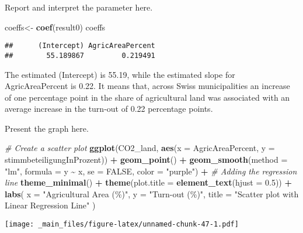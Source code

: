 \documentclass[
]{book}
\newenvironment{Shaded}{\begin{snugshade}}{\end{snugshade}}
\newcommand{\AttributeTok}[1]{\textcolor[rgb]{0.13,0.29,0.53}{#1}}
\newcommand{\CommentTok}[1]{\textcolor[rgb]{0.56,0.35,0.01}{\textit{#1}}}
\newcommand{\ConstantTok}[1]{\textcolor[rgb]{0.56,0.35,0.01}{#1}}
\newcommand{\FloatTok}[1]{\textcolor[rgb]{0.00,0.00,0.81}{#1}}
\newcommand{\FunctionTok}[1]{\textcolor[rgb]{0.13,0.29,0.53}{\textbf{#1}}}
\newcommand{\NormalTok}[1]{#1}
\newcommand{\OtherTok}[1]{\textcolor[rgb]{0.56,0.35,0.01}{#1}}
\newcommand{\SpecialCharTok}[1]{\textcolor[rgb]{0.81,0.36,0.00}{\textbf{#1}}}
\newcommand{\StringTok}[1]{\textcolor[rgb]{0.31,0.60,0.02}{#1}}
\begin{document}
Report and interpret the parameter here.

\begin{Shaded}
\begin{Highlighting}[]
\NormalTok{coeffs}\OtherTok{\textless{}{-}} \FunctionTok{coef}\NormalTok{(result0)}
\NormalTok{coeffs}
\end{Highlighting}
\end{Shaded}

\begin{verbatim}
##      (Intercept) AgricAreaPercent 
##        55.189867         0.219491
\end{verbatim}

The estimated (Intercept) is 55.19, while the estimated slope for AgricAreaPercent is 0.22. It means that, across Swiss municipalities an increase of one percentage point in the share of agricultural land was associated with an average increase in the turn-out of 0.22 percentage points.

Present the graph here.

\begin{Shaded}
\begin{Highlighting}[]
\CommentTok{\# Create a scatter plot}
\FunctionTok{ggplot}\NormalTok{(CO2\_land, }\FunctionTok{aes}\NormalTok{(}\AttributeTok{x =}\NormalTok{ AgricAreaPercent, }\AttributeTok{y =}\NormalTok{ stimmbeteiligungInProzent)) }\SpecialCharTok{+}
  \FunctionTok{geom\_point}\NormalTok{() }\SpecialCharTok{+}
  \FunctionTok{geom\_smooth}\NormalTok{(}\AttributeTok{method =} \StringTok{"lm"}\NormalTok{, }\AttributeTok{formula =}\NormalTok{ y }\SpecialCharTok{\textasciitilde{}}\NormalTok{ x, }\AttributeTok{se =} \ConstantTok{FALSE}\NormalTok{, }\AttributeTok{color =} \StringTok{"purple"}\NormalTok{) }\SpecialCharTok{+}  \CommentTok{\# Adding the regression line}
  \FunctionTok{theme\_minimal}\NormalTok{() }\SpecialCharTok{+}
  \FunctionTok{theme}\NormalTok{(}\AttributeTok{plot.title =} \FunctionTok{element\_text}\NormalTok{(}\AttributeTok{hjust =} \FloatTok{0.5}\NormalTok{)) }\SpecialCharTok{+}
  \FunctionTok{labs}\NormalTok{(}
    \AttributeTok{x =} \StringTok{"Agricultural Area (\%)"}\NormalTok{,}
    \AttributeTok{y =} \StringTok{"Turn{-}out (\%)"}\NormalTok{,}
    \AttributeTok{title =} \StringTok{"Scatter plot with Linear Regression Line"}
\NormalTok{  )}
\end{Highlighting}
\end{Shaded}

\texttt{[image: \_main\_files/figure-latex/unnamed-chunk-47-1.pdf]}
\end{document}
